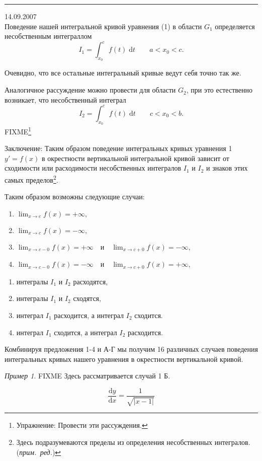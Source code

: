 \documentclass[a4paper,10pt]{report}
\newcommand{\ud}{\mathrm{d}}
\newcommand{\ednote}{(\textit{прим.\ ред.})}
\theoremstyle{definition}
\theoremstyle{remark}
\newtheorem{example}{Пример}[section]
\theoremstyle{plain}
\begin{document}
\rule{.3\textwidth}{.5pt} 14.09.2007\\

Поведение нашей интегральной кривой уравнения (1) в области $G_1$ определяется несобственным интеграллом
\[
 I_1 = \int_{x_0}^c f(t)\; \ud t \qquad a < x_0 < c.
\]

Очевидно, что все остальные интегральный кривые ведут себя точно так же.

Аналогичное рассуждение можно провести для области $G_2$, при это естественно возникает, что несобственный интеграл
\[
 I_2 = \int_{x_0}^c f(t)\; \ud t \qquad c < x_0 < b.
\]
FIXME\footnote{Упражнение: Провести эти рассуждения.}

Заключение: Таким образом поведение интегральных кривых уравнения 1 $y' = f(x)$ в окрестности вертикальной интегральной кривой зависит от сходимости или расходимости несобственных интегралов $I_1$ и $I_2$ и знаков этих самых пределов\footnote{Здесь подразумеваются пределы из определения несобственных интегралов. \ednote}.

Таким образом возможны следующие случаи:
\begin{enumerate}
 \item $\displaystyle\lim_{x \to c} f(x) = +\infty,$
 \item $\displaystyle\lim_{x \to c} f(x) = -\infty,$
 \item $\displaystyle\lim_{x \to c-0} f(x) = +\infty \quad \text{и} \quad \lim_{x \to c+0} f(x) = -\infty,$
 \item $\displaystyle\lim_{x \to c-0} f(x) = -\infty \quad \text{и} \quad \lim_{x \to c+0} f(x) = +\infty,$
\end{enumerate}
\begin{enumerate}
 \renewcommand{\theenumi}{\Asbuk{enumi}}
 \item интегралы $I_1$ и $I_2$ расходятся,
 \item интегралы $I_1$ и $I_2$ сходятся,
 \item интеграл $I_1$ расходится, а интеграл $I_2$ сходится.
 \item интеграл $I_1$ сходится, а интеграл $I_2$ расходится.
\end{enumerate}
Комбинируя предложения 1-4 и А-Г  мы получим 16 различных случаев поведения интегральных кривых нашего уравнения в окрестности вертикальной кривой.

\begin{example}
 FIXME
 Здесь рассматривается случай 1 Б.

 \begin{equation*}
  \frac{\ud y}{\ud x} = \frac{1}{\sqrt{|x-1|}}
 \end{equation*}
\end{example}
\end{document}
